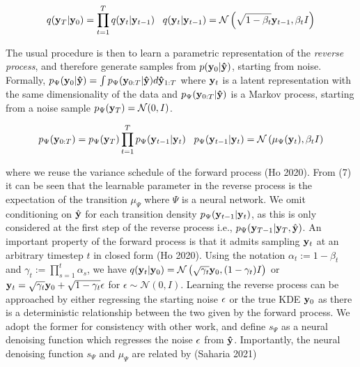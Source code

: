 \documentclass{article}
\begin{document}
\begin{equation}
q(\bold{y}_{T}|\bold{y}_{0}) = \prod_{t=1}^{T}q(\bold{y}_{t}|\bold{y}_{t-1}) \;\;\; q(\bold{y}_{t}|\bold{y}_{t-1}) = \mathcal{N}\left(\sqrt{1-\beta_{t}}\bold{y}_{t-1},\beta_t I\right)
\end{equation}

The usual procedure is then to learn a parametric representation of the \emph{reverse process}, and therefore generate samples from  $p(\bold{y}_{0}|\bold{\hat{y}})$, starting from noise. Formally, $p_{\Psi}(\bold{y}_{0}|\bold{\hat{y}}) = \int p_{\Psi}(\bold{y}_{0:T}|\bold{\hat{y}})d\bold{\hat{y}}_{1:T}$ where $\bold{y}_{t}$ is a latent representation with the same dimensionality of the data and $p_{\Psi}(\bold{y}_{0:T}|\bold{\hat{y}})$ is a Markov process, starting from a noise sample $p_{\Psi}(\bold{y}_{T}) = \mathcal{N}(0,I)$. 

\begin{equation}
p_{\Psi}(\bold{y}_{0:T}) = p_{\Psi}(\bold{y}_{T})\prod_{t=1}^{T} p_{\Psi}(\bold{y}_{t-1}|\bold{y}_{t}) \;\;\; p_{\Psi}(\bold{y}_{t-1}|\bold{y}_{t}) = \mathcal{N}\left(\mu_{\Psi}(\bold{y}_{t}),\beta_{t}I\right)
\end{equation}

where we reuse the variance schedule of the forward process (Ho 2020). From (7) it can be seen that the learnable parameter in the reverse process is the expectation of the transition $\mu_{\Psi}$ where $\Psi$ is a neural network. We omit conditioning on $\hat{\bold{y}}$ for each transition density $p_{\Psi}(\bold{y}_{t-1}|\bold{y}_{t})$, as this is only considered at the first step of the reverse process i.e., $p_{\Psi}(\bold{y}_{T-1}|\bold{y}_{T},\hat{\bold{y}})$. An important property of the forward process is that it admits sampling $\bold{y}_t$ at an arbitrary timestep $t$ in closed form (Ho 2020). Using the notation $\alpha_t := 1 - \beta_t$ and $\gamma_t := \prod_{s=1}^{t} \alpha_s$, we have $q(\bold{y}_t|\bold{y}_0) = \mathcal{N} \left(\sqrt{\gamma_{t}} \bold{y}_{0}, (1 - \gamma_t)I \right)$ or $\bold{y}_{t} = \sqrt{\gamma_{t}}\bold{y}_{0} + \sqrt{1-\gamma_{t}}\bold{\epsilon}$ for $\epsilon \sim \mathcal{N}(0,I)$. Learning the reverse process can be approached by either regressing the starting noise $\bold{\epsilon}$ or the true KDE $\bold{y}_{0}$ as there is a deterministic relationship between the two given by the forward process. We adopt the former for consistency with other work, and define $s_{\Psi}$ as a neural denoising function which regresses the noise $\bold{\epsilon}$ from $\bold{\hat{y}}$. Importantly, the neural denoising function $s_{\Psi}$ and $\mu_{\Psi}$ are related by (Saharia 2021)
\end{document}
